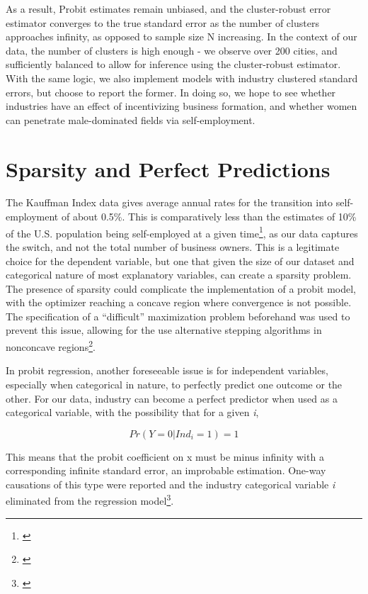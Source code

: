 As a result, Probit estimates remain unbiased, and the cluster-robust error estimator converges to the true standard error as the number of clusters approaches infinity, as opposed to sample size N increasing. In the context of our data, the number of clusters is high enough - we observe over 200 cities, and sufficiently balanced to allow for inference using the cluster-robust estimator. With the same logic, we also implement models with industry clustered standard errors, but choose to report the former. In doing so, we hope to see whether industries have an effect of incentivizing business formation, and whether women can penetrate male-dominated fields via self-employment. 

\section{Sparsity and Perfect Predictions}

The Kauffman Index data gives average annual rates for the transition into self-employment of about 0.5\%. This is comparatively less than the estimates of 10\% of the U.S. population being self-employed at a given time\footnote{\cite{ChatterjiGlaeserKerr2014}}, as our data captures the switch, and not the total number of business owners. This is a legitimate choice for the dependent variable, but one that given the size of our dataset and categorical nature of most explanatory variables, can create a sparsity problem. The presence of sparsity could complicate the implementation of a probit model, with the optimizer reaching a concave region where convergence is not possible. The specification of a ``difficult'' maximization problem beforehand was used to prevent this issue, allowing for the use alternative stepping algorithms in nonconcave regions\footnote{\cite{GouldPitbladoPoi2010}}.

In probit regression, another foreseeable issue is for independent variables, especially when categorical in nature, to perfectly predict one outcome or the other. For our data, industry can become a perfect predictor when used as a categorical variable, with the possibility that for a given \textit{i},

\begin{dmath}
Pr(Y = 0 | Ind_i = 1) = 1
\end{dmath}

This means that the probit coefficient on x must be minus infinity with a corresponding infinite standard error, an improbable estimation. One-way causations of this type were reported and the industry categorical variable \textit{i} eliminated from the regression model\footnote{\cite{GouldPitbladoPoi2010}}. 

